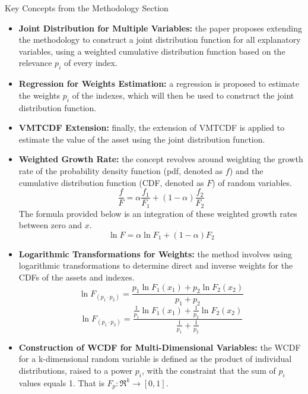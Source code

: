 \documentclass{beamer}
\begin{document}
\begin{frame}[allowframebreaks]{Key Concepts from the Methodology Section}
\begin{itemize}
       	\item \textbf{Joint Distribution for Multiple Variables:} the paper proposes extending the methodology to construct a joint distribution function for all explanatory variables, using a weighted cumulative distribution function based on the relevance \(p_{i}\) of every index.
       	\item \textbf{Regression for Weights Estimation:} a regression is proposed to estimate the weights \(p_{i}\) of the indexes, which will then be used to construct the joint distribution function.
       	\item \textbf{VMTCDF Extension:} finally, the extension of VMTCDF is applied to estimate the value of the asset using the joint distribution function.
       	\item \textbf{Weighted Growth Rate:} the concept revolves around weighting the growth rate of the probability density function (pdf, denoted as \(f\)) and the cumulative distribution function (CDF, denoted as \(F\)) of random variables.
       	\begin{equation}
       		\frac{f}{F} = \alpha \frac{f_{1}}{F_{1}} + (1 - \alpha) \frac{f_{2}}{F_{2}}
       	\end{equation}
       	The formula provided below is an integration of these weighted growth rates between zero and \(x\).
       	\begin{equation}
       		\ln F = \alpha \ln F_{1} + (1 - \alpha)F_{2}
       	\end{equation}
       	\item \textbf{Logarithmic Transformations for Weights:} the method involves using logarithmic transformations to determine direct and inverse weights for the CDFs of the assets and indexes.
       	\begin{equation}
       		\ln F_{(p_{1} \cdot p_{2})} = \frac{p_{1} \ln F_{1}(x_{1}) + p_{2} \ln F_{2}(x_{2})}{p_{1} + p_{2}}
       	\end{equation}
       \begin{equation}
           \ln F_{(p_{1} \cdot p_{2})} = \frac{\frac{1}{p_{1}} \ln F_{1}(x_{1}) + \frac{1}{p_{2}} \ln F_{2}(x_{2})}{\frac{1}{p_{1}} + \frac{1}{p_{2}}}
       \end{equation}
       	\item \textbf{Construction of WCDF for Multi-Dimensional Variables:} the WCDF for a k-dimensional random variable is defined as the product of individual distributions, raised to a power \(p_{i}\), with the constraint that the sum of \(p_{i}\) values equals 1. That is \(F_{p}:\Re^{k} \rightarrow [0,1]\).

\end{itemize}
\end{frame}
\end{document}
